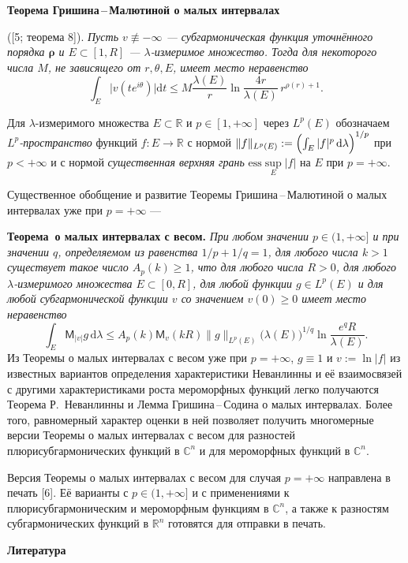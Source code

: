 \noindent
{\bf Теорема Гришина\,--\,Малютиной о малых интервалах} {\rm ([5; теорема 8]). {\it  Пусть  $v\not\equiv -\infty$ --- субгармоническая функция уточнённого порядка $\mathbf{\rho}$ и $E\subset [1,R]$ --- $\lambda$-измеримое множество. Тогда для некоторого  числа $M$, не зависящего от $r, \theta, E$, имеет место неравенство
$$
\int_{E} \bigl|v(te^{i\theta})\bigr| \mathrm{d} t\leq
M\frac{\lambda( E)}{r}\ln
\frac{4r}{\lambda( E)}\, r^{\rho(r)+1}.
$$
}

Для $\lambda$-измеримого множества $E\subset \mathbb R$ и $p\in [1,+\infty]$
через $L^p(E)$ обозначаем \textit{$L^p$-пространство\/} функций $f\colon E\to \mathbb R$  с нормой $\|f\|_{L^p(E)}:=\Bigl(\int_E|f|^p\,\mathrm{d}\lambda\Bigr)^{1/p}$ при $p<+\infty$ и с нормой \textit{существенная верхняя грань\/} $\mathrm{ess}\sup\limits_E |f|$  на $E$ при $p=+\infty$.

Существенное обобщение и развитие  Теоремы Гришина\,--\,Малютиной о малых интервалах уже при $p=+\infty$ ---

\noindent
\textbf{Теорема~о малых интервалах с весом.} {\it При любом значении $p\in (1,+\infty]$ и при значении $q$, определяемом из равенства $1/p+1/q=1$,   для любого  числа $k>1$   существует такое число $A_p(k)\geq 1$, что
для любого числа  $R> 0$, для любого $\lambda$-измеримого множества  $E\subset [0,R]$,  для любой функции  $g\in L^p(E)$ и  для любой субгармонической функции $v$  со значением  $v(0)\geq 0$  имеет место неравенство
$$
\int_E\mathsf{M}_{|v|}g\,\mathrm{d} \lambda \leq A_p(k)\mathsf{M}_{v}(kR)
\|g\|_{L^p(E)}\bigl(\lambda(E)\bigr)^{1/q}\ln \frac{e^qR}{\lambda(E)}.
$$
}
Из Теоремы о малых интервалах с весом уже при $p=+\infty$, $g\equiv 1$ и $v:=\ln |f|$ из известных вариантов определения  характеристики Неванлинны и её взаимосвязей с другими характеристиками роста мероморфных функций  легко  получаются Теорема Р.~Неванлинны и Лемма Гришина\,--\,Содина о малых интервалах. Более того, равномерный характер оценки в ней позволяет получить многомерные версии Теоремы о малых интервалах с весом для разностей плюрисубгармонических функций в $\mathbb C^n$ и для мероморфных функций в $\mathbb C^n$.

Версия Теоремы о малых интервалах с весом для случая $p=+\infty$ направлена
в печать [6]. Её варианты с $p\in (1,+\infty]$ и с применениями к   плюрисубгармоническим и мероморфным функциям в $\mathbb C^n$, а также
к разностям субгармонических функций в $\mathbb R^n$ готовятся для отправки в печать.

\smallskip \centerline {\bf Литература} \nopagebreak

}
